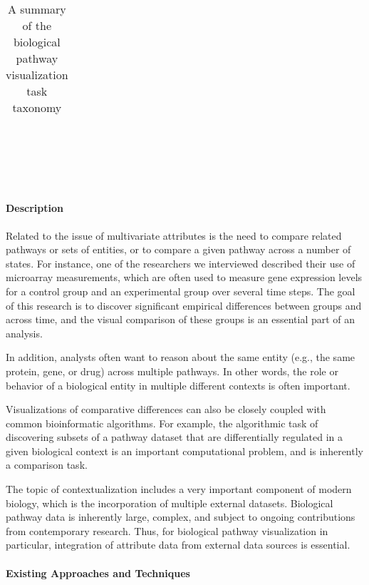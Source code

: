 \documentclass[twocolumn]{bmcart}%
\begin{document}
\begin{table}[!ht]
\begin{tabular} { p{0.1cm}|p{2.3cm}|p{4.4cm}| }
\end{tabular}
\centering
\\
\caption{A summary of the biological pathway visualization task taxonomy}
\label{table:taxonomy}
\end{table}


\ \\ \

\paragraph*{Description}

Related to the issue of multivariate attributes is the need to compare related pathways or sets of entities, or to compare a given pathway across a number of states.
For instance, one of the researchers we interviewed described their use of microarray measurements, which are often used to measure gene expression levels for a control group and an experimental group over several time steps.
The goal of this research is to discover significant empirical differences between groups and across time, and the visual comparison of these groups is an essential part of an analysis.

In addition, analysts often want to reason about the same entity (e.g., the same protein, gene, or drug) across multiple pathways.
In other words, the role or behavior of a biological entity in multiple different contexts is often important.

Visualizations of comparative differences can also be closely coupled with common bioinformatic algorithms.
For example, the algorithmic task of discovering subsets of a pathway dataset that are differentially regulated in a given biological context is an important computational problem, and is inherently a comparison task.

The topic of contextualization includes a very important component of modern biology, which is the incorporation of multiple external datasets.
Biological pathway data is inherently large, complex, and subject to ongoing contributions from contemporary research.
Thus, for biological pathway visualization in particular, integration of attribute data from external data sources is essential.

\paragraph*{Existing Approaches and Techniques}
\end{document}
